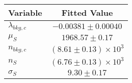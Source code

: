 \begin{tabular}[t]{lc}
\hline
Variable &Fitted Value\\
\hline\hline
$\lambda_{bkg,c}$&$-0.00381\pm0.00040$\\
\hline
$\mu_{S}$&$1968.57\pm0.17$\\
\hline
$n_{bkg,c}$&$(8.61\pm0.13)\times 10^3$\\
\hline
$n_{S}$&$(6.76\pm0.13)\times 10^3$\\
\hline
$\sigma_{S}$&$9.30\pm0.17$\\
\hline
\end{tabular}